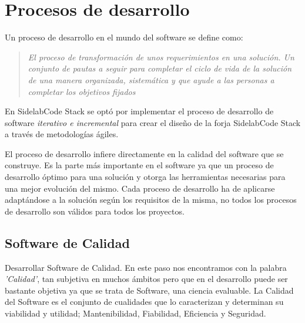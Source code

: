 %
% 

\chapter{Procesos de desarrollo}
\label{chap:procesos-desarrollo}

\par Un proceso de desarrollo en el mundo del software se define como:

\begin{quote}
\emph{El proceso de transformación de unos requerimientos en una solución. Un conjunto de pautas a seguir para completar el ciclo de vida de la solución de una manera organizada, sistemática y que ayude a las personas a completar los objetivos fijados}
\end{quote}

\par En SidelabCode Stack se optó por implementar el proceso de desarrollo de software \emph{iterativo e incremental} para crear el dise\~no de la forja SidelabCode Stack a través de metodolog\'ias ágiles.

\par El proceso de desarrollo infiere directamente en la calidad del software que se construye. Es la parte más importante en el software ya que un proceso de desarrollo óptimo para una solución y otorga las herramientas necesarias para una mejor evolución del mismo. Cada proceso de desarrollo ha de aplicarse adaptándose a la solución según los requisitos de la misma, no todos los procesos de desarrollo son válidos para todos los proyectos.

\section{Software de Calidad}
\label{sec:software-calidad}

\par Desarrollar Software de Calidad. En este paso nos encontramos con la palabra \emph{'Calidad'}, tan subjetiva en muchos ámbitos pero que en el desarrollo puede ser bastante objetiva ya que se trata de Software, una ciencia evaluable. La Calidad del Software es el conjunto de cualidades que lo caracterizan y determinan su viabilidad y utilidad; Mantenibilidad, Fiabilidad, Eficiencia y Seguridad.

